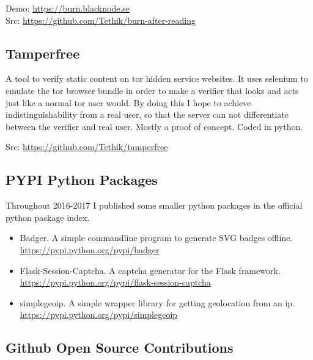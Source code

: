 \documentclass[a4paper,10pt]{article}
\begin{document}
Demo: \href{https://burn.blacknode.se}{https://burn.blacknode.se}\\
Src: \href{https://github.com/Tethik/burn-after-reading}{https://github.com/Tethik/burn-after-reading}\\

\subsection{Tamperfree}
A tool to verify static content on tor hidden service websites. It uses selenium to emulate the tor browser bundle in order to make a verifier that looks and acts just like a normal tor user would. By doing this I hope to achieve indistinguishability from a real user, so that the server can not differentiate between the verifier and real user. Mostly a proof of concept. Coded in python.

Src: \href{https://github.com/Tethik/tamperfree}{https://github.com/Tethik/tamperfree}


\subsection{PYPI Python Packages}
Throughout 2016-2017 I published some smaller python packages in the official python package index.

\begin{itemize}
\item Badger. A simple commandline program to generate SVG badges offline.\\ \href{https://pypi.python.org/pypi/badger}{https://pypi.python.org/pypi/badger}
\item Flask-Session-Captcha. A captcha generator for the Flask framework.\\ \href{https://pypi.python.org/pypi/flask-session-captcha}{https://pypi.python.org/pypi/flask-session-captcha}
\item simplegeoip. A simple wrapper library for getting geolocation from an ip.\\ \href{https://pypi.python.org/pypi/simplegeoip}{https://pypi.python.org/pypi/simplegeoip}
\end{itemize}

\newpage
\subsection{Github Open Source Contributions}

\end{document}
